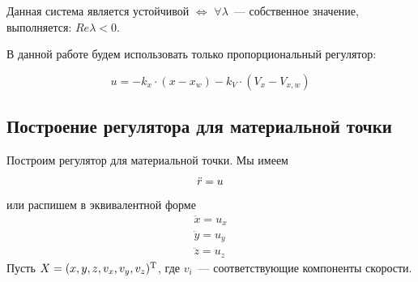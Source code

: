 \documentclass[a4paper,12pt]{article}
\begin{document}
Данная система является устойчивой $\Longleftrightarrow$ $\forall \lambda$~--- собственное значение, выполняется: $Re\lambda < 0$.

В данной работе будем использовать только пропорциональный регулятор:

$$u = -k_x \cdot (x - x_w) - k_V\cdot (V_x - V_{x,w})$$


\subsection{Построение регулятора для материальной точки}

Построим регулятор для материальной точки. Мы имеем
\begin{equation*}
    \Ddot{r} = u
\end{equation*}
или распишем в эквивалентной форме
\begin{align*}
    \ddot{x} = u_x \\
    \ddot{y} = u_y \\
    \ddot{z} = u_z
\end{align*}
Пусть $X = (x,y,z,v_x,v_y,v_z)^\text{\textup{T}}$, где $v_i$~--- соответствующие компоненты скорости.
\end{document}

